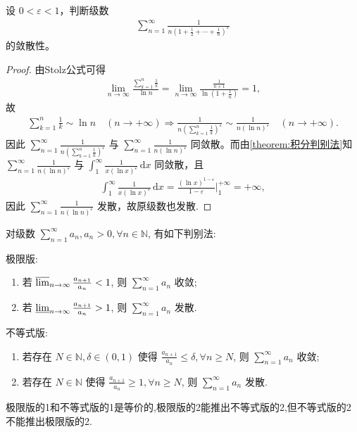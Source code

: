 \documentclass[../../main.tex]{subfiles}%
\begin{document}
\begin{example}
设 $0<\varepsilon<1$，判断级数
\begin{align*}
\sum_{n=1}^\infty \frac{1}{n\left(1+\frac12+\cdots+\frac1n\right)^\varepsilon}
\end{align*}
的敛散性。
\end{example}
\begin{proof}
由Stolz公式可得
\begin{align}
\lim\limits_{n\rightarrow\infty}\frac{\sum_{k=1}^n \frac1k}{\ln n}
= \lim\limits_{n\rightarrow\infty}\frac{\frac{1}{n+1}}{\ln\left(1+\frac1n\right)} = 1, \label{eq:stolz}
\end{align}
故
\begin{align*}
\sum_{k=1}^n \frac1k \sim \ln n \quad (n\rightarrow+\infty)
\Longrightarrow
\frac{1}{n\left(\sum_{k=1}^n \frac1k\right)^\varepsilon}
\sim \frac{1}{n(\ln n)^\varepsilon} \quad (n\rightarrow+\infty).
\end{align*}
因此 $\sum\limits_{n=1}^{\infty}\frac{1}{n\left(\sum_{k=1}^n \frac1k\right)^\varepsilon}$ 与 $\sum\limits_{n=1}^{\infty}\frac{1}{n(\ln n)^\varepsilon}$ 同敛散。而由\cref{theorem:积分判别法}知 $\sum\limits_{n=1}^{\infty}\frac{1}{n(\ln n)^\varepsilon}$ 与 $\int_1^{\infty}\frac{1}{x(\ln x)^\varepsilon}\,\mathrm{d}x$ 同敛散，且
\begin{align}
\int_1^{\infty}\frac{1}{x(\ln x)^\varepsilon}\,\mathrm{d}x
= \frac{(\ln x)^{1-\varepsilon}}{1-\varepsilon}\Big|_{1}^{+\infty} = +\infty, \label{eq:integral}
\end{align}
因此 $\sum\limits_{n=1}^{\infty}\frac{1}{n(\ln n)^\varepsilon}$ 发散，故原级数也发散.
\end{proof}

\begin{theorem}[比值判别法]\label{theorem:级数-比值判别法}
对级数 \( \sum_{n=1}^\infty a_n, a_n > 0, \forall n \in \mathbb{N} \), 有如下判别法:

极限版:
\begin{enumerate}
\item 若 \( \varlimsup_{n \to \infty} \frac{a_{n + 1}}{a_n} < 1 \), 则 \( \sum_{n=1}^\infty a_n \) 收敛;

\item 若 \( \varliminf_{n \to \infty} \frac{a_{n + 1}}{a_n} > 1 \), 则 \( \sum_{n=1}^\infty a_n \) 发散.
\end{enumerate}

不等式版:
\begin{enumerate}
\item 若存在 \( N \in \mathbb{N}, \delta \in (0, 1) \) 使得 \( \frac{a_{n + 1}}{a_n} \leqslant \delta, \forall n \geqslant N \), 则 \( \sum_{n=1}^\infty a_n \) 收敛;

\item 若存在 \( N \in \mathbb{N} \) 使得 \( \frac{a_{n + 1}}{a_n} \geqslant 1, \forall n \geqslant N \), 则 \( \sum_{n=1}^\infty a_n \) 发散.
\end{enumerate}
\end{theorem}
\begin{remark}
极限版的1和不等式版的1是等价的,极限版的2能推出不等式版的2,但不等式版的2不能推出极限版的2.
\end{remark}
\end{document}
